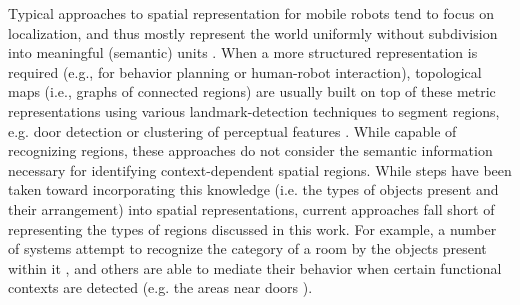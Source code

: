 \documentclass[letterpaper]{article}
\begin{document}
Typical approaches to spatial representation for mobile robots tend to focus on localization, and thus mostly represent the world uniformly without subdivision into meaningful (semantic) units \cite{Thrun02a}. When a more structured representation is required (e.g., for behavior planning or human-robot interaction), topological maps (i.e., graphs of connected regions) are usually built on top of these metric representations using various landmark-detection techniques to segment regions, e.g. door detection \cite{Hawes/etal:2009b} or clustering of perceptual features \cite{Peltason/etal:2009a}. While capable of recognizing regions, these approaches do not consider the semantic information necessary for identifying context-dependent spatial regions. While steps have been taken toward incorporating this knowledge  (i.e. the types of objects present and their arrangement) into spatial representations, current approaches fall short of representing the types of regions discussed in this work. For example, a number of systems attempt to recognize the category of a room by the objects present within it \cite{Hawes/etal:2010b}, and others are able to mediate their behavior when certain functional contexts are detected (e.g. the areas near doors \cite{Zender2008a}).

\end{document}
